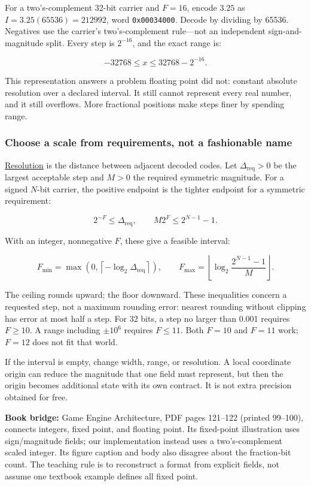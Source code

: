 For a two's-complement 32-bit carrier and \(F=16\), encode \(3.25\) as \(I=3.25(65536)=212992\), word \texttt{0x00034000}. Decode by dividing by 65536. Negatives use the carrier's two's-complement rule---not an independent sign-and-magnitude split. Every step is \(2^{-16}\), and the exact range is:

\[
-32768\le x\le32768-2^{-16}.
\]

This representation answers a problem floating point did not: constant absolute resolution over a declared interval. It still cannot represent every real number, and it still overflows. More fractional positions make steps finer by spending range.

\subsubsection{Choose a scale from requirements, not a fashionable name}\label{05-engine-i-ch001-choose-a-scale-from-requirements-not-a-fashionable-name}

\hyperref[appendix-ceb4c4a9b5a1]{Resolution} is the distance between adjacent decoded codes. Let \(\Delta_{\mathrm{req}}>0\) be the largest acceptable step and \(M>0\) the required symmetric magnitude. For a signed \(N\)-bit carrier, the positive endpoint is the tighter endpoint for a symmetric requirement:

\[
2^{-F}\le\Delta_{\mathrm{req}},
\qquad
M2^F\le2^{N-1}-1.
\]

With an integer, nonnegative \(F\), these give a feasible interval:

\[
F_{\min}=\max\!\left(0,\left\lceil-\log_2\Delta_{\mathrm{req}}\right\rceil\right),
\qquad
F_{\max}=\left\lfloor\log_2\frac{2^{N-1}-1}{M}\right\rfloor.
\]

The ceiling rounds upward; the floor downward. These inequalities concern a requested step, not a maximum rounding error: nearest rounding without clipping has error at most half a step. For 32 bits, a step no larger than 0.001 requires \(F\ge10\). A range including \(\pm10^6\) requires \(F\le11\). Both \(F=10\) and \(F=11\) work; \(F=12\) does not fit that world.

If the interval is empty, change width, range, or resolution. A local coordinate origin can reduce the magnitude that one field must represent, but then the origin becomes additional state with its own contract. It is not extra precision obtained for free.

\textbf{Book bridge:} Game Engine Architecture, PDF pages 121--122 (printed 99--100), connects integers, fixed point, and floating point. Its fixed-point illustration uses sign/magnitude fields; our implementation instead uses a two's-complement scaled integer. Its figure caption and body also disagree about the fraction-bit count. The teaching rule is to reconstruct a format from explicit fields, not assume one textbook example defines all fixed point.

